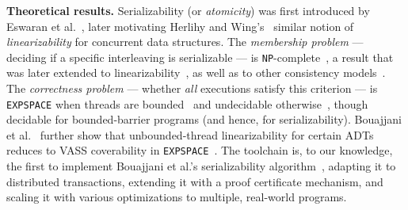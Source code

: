 
\textbf{Theoretical results.}
Serializability (or \emph{atomicity}) was
first introduced by Eswaran et al.~\cite{EsGrKoTr76},
later motivating Herlihy and Wing's~\cite{HeWe87,HeWi90} similar notion of \emph{linearizability} for concurrent data structures. 
%
The \emph{membership problem} --- deciding if a specific interleaving is serializable --- is \texttt{NP}-complete~\cite{Pa79}, a result that was later extended to linearizability~\cite{GiKo97}, as well as to other consistency models~\cite{BiEn19}. 
% 
The \emph{correctness problem} --- whether \emph{all} executions satisfy this criterion --- is \texttt{EXPSPACE} when threads are bounded~\cite{AlMcPe96} and undecidable otherwise~\cite{BoEmEnHa13}, though decidable for bounded-barrier programs (and hence, for serializability). Bouajjani et al.~\cite{BoEmEnHa18} further show that unbounded-thread linearizability for certain ADTs reduces to VASS coverability in \texttt{EXPSPACE}~\cite{Ra78}. The \toolname{} toolchain is, to our knowledge, the first to implement Bouajjani et al.’s serializability algorithm~\cite{BoEmEnHa13}, adapting it to distributed transactions, extending it with a proof certificate mechanism, and scaling it with various optimizations to multiple, real-world programs. 

